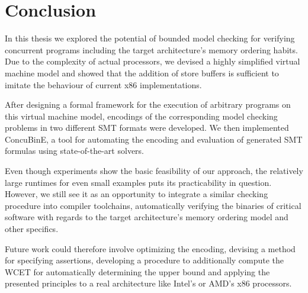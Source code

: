 \section{Conclusion}


In this thesis we explored the potential of bounded model checking for verifying concurrent programs
including the target architecture's memory ordering habits.
Due to the complexity of actual processors, we devised a highly simplified virtual machine model
and showed that the addition of store buffers is sufficient to imitate the behaviour of current x86 implementations.

After designing a formal framework for the execution of arbitrary programs on this virtual machine model,
encodings of the corresponding model checking problems in two different SMT formats were developed.
We then implemented ConcuBinE, a tool for automating the encoding and evaluation of generated SMT formulas using state-of-the-art solvers.

Even though experiments show the basic feasibility of our approach, the relatively large runtimes for even small examples puts its practicability in question.
However, we still see it as an opportunity to integrate a similar checking procedure into compiler toolchains, automatically verifying the binaries of critical software with regards to the target architecture's memory ordering model and other specifics.

Future work could therefore involve optimizing the encoding,
devising a method for specifying assertions,
developing a procedure to additionally compute the WCET for automatically determining the upper bound and applying the presented principles to a real architecture like Intel's or AMD's x86 processors.
